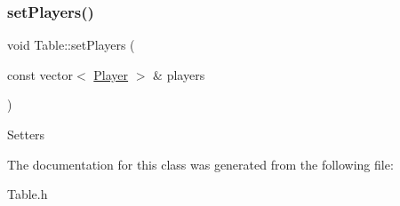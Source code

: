 \subsubsection{\texorpdfstring{set\+Players()}{setPlayers()}}
{\footnotesize\ttfamily void Table\+::set\+Players (\begin{DoxyParamCaption}\item[{const vector$<$ \mbox{\hyperlink{classPlayer}{Player}} $>$ \&}]{players }\end{DoxyParamCaption})\hspace{0.3cm}{\ttfamily [inline]}}

Setters 

The documentation for this class was generated from the following file\+:\begin{DoxyCompactItemize}
\item 
Table.\+h\end{DoxyCompactItemize}
